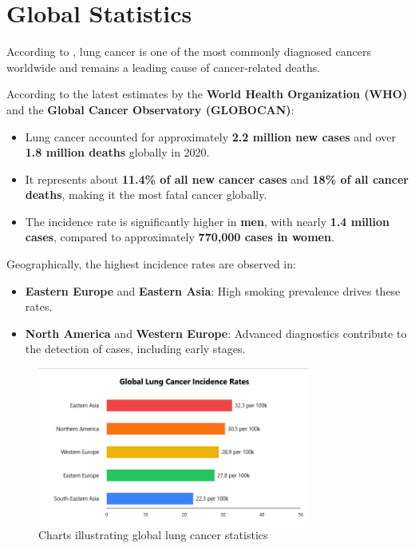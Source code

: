 \section{Global Statistics}
\begin{remark}
According to \cite{jemal2011global}, lung cancer is one of the most commonly diagnosed cancers worldwide and remains a leading cause of cancer-related deaths. 
\end{remark}
According to the latest estimates by the \textbf{World Health Organization (WHO)} and the \textbf{Global Cancer Observatory (GLOBOCAN)}:
\begin{highlight}
\begin{itemize}
    \item Lung cancer accounted for approximately \textbf{2.2 million new cases} and over \textbf{1.8 million deaths} globally in 2020.
    \item It represents about \textbf{11.4\% of all new cancer cases} and \textbf{18\% of all cancer deaths}, making it the most fatal cancer globally.
    \item The incidence rate is significantly higher in \textbf{men}, with nearly \textbf{1.4 million cases}, compared to approximately \textbf{770,000 cases in women}.
\end{itemize}
\end{highlight}

Geographically, the highest incidence rates are observed in:
\begin{highlight}
\begin{itemize}
    \item \textbf{Eastern Europe} and \textbf{Eastern Asia}: High smoking prevalence drives these rates.
    \item \textbf{North America} and \textbf{Western Europe}: Advanced diagnostics contribute to the detection of cases, including early stages.
\end{itemize}
\end{highlight}
\begin{figure}[h!]
    \centering
    \includegraphics[width=0.8\textwidth]{images/lunc cancer global.png}
    \caption{Charts illustrating global lung cancer statistics}
    \label{fig:lung_stats}
\end{figure}
\newpage
